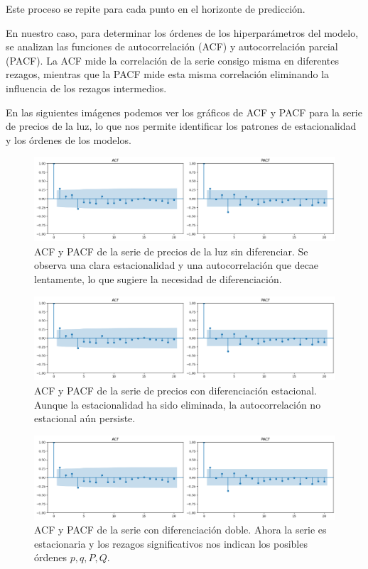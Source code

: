Este proceso se repite para cada punto en el horizonte de predicción.

En nuestro caso, para determinar los órdenes de los hiperparámetros del modelo, se analizan las funciones de autocorrelación (ACF) y autocorrelación parcial (PACF). La ACF mide la correlación de la serie consigo misma en diferentes rezagos, mientras que la PACF mide esta misma correlación eliminando la influencia de los rezagos intermedios.

En las siguientes imágenes podemos ver los gráficos de ACF y PACF para la serie de precios de la luz, lo que nos permite identificar los patrones de estacionalidad y los órdenes de los modelos.

\begin{figure}[H]
    \centering
    \includegraphics[width=0.7\linewidth]{figuras/ACF_PACF.png}
    \caption[ACF y PACF para d=D=0]{ACF y PACF de la serie de precios de la luz sin diferenciar. Se observa una clara estacionalidad y una autocorrelación que decae lentamente, lo que sugiere la necesidad de diferenciación.}
    \label{fig:ACF_sin_diferenciar}
\end{figure}
\begin{figure}[H]
    \centering
    \includegraphics[width=0.7\linewidth]{figuras/ACF_PACF.png}
    \caption[ACF y PACF para D=1, s=24]{ACF y PACF de la serie de precios con diferenciación estacional. Aunque la estacionalidad ha sido eliminada, la autocorrelación no estacional aún persiste.}
    \label{diferenciado}
\end{figure}
\begin{figure}[H]
    \centering
    \includegraphics[width=0.7\linewidth]{figuras/ACF_PACF.png}
    \caption[ACF y PACF para d=D=1, s=24]{ACF y PACF de la serie con diferenciación doble. Ahora la serie es estacionaria y los rezagos significativos nos indican los posibles órdenes $p, q, P, Q$.}
    \label{dobledifereniado}
\end{figure}

